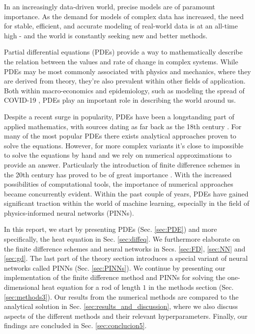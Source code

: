 In an increasingly data-driven world, precise models are of paramount importance.
As the demand for models of complex data has increased, the need for stable, efficient, and accurate modeling of real-world data is at an all-time high - and the world is constantly seeking new and better methods.

Partial differential equations (PDEs) provide a way to mathematically describe the relation between the values and rate of change in complex systems.
While PDEs may be most commonly associated with physics and mechanics, where they are derived from theory, they're also prevalent within other fields of application.
Both within macro-economics \cite{ecoPDE} and epidemiology, such as modeling the spread of COVID-19 \cite{covidus}, PDEs play an important role in describing the world around us. 

Despite a recent surge in popularity, PDEs have been a longstanding part of applied mathematics, with sources dating as far back as the 18th century \cite{Cajori}. For many of the most popular PDEs there exists analytical approaches proven to solve the equations. However, for more complex variants it's close to impossible to solve the equations by hand and we rely on numerical approximations to provide an answer. Particularly the introduction of finite difference schemes in the 20th century has proved to be of great importance \cite{sloan2012}. With the increased possibilities of computational tools, the importance of numerical approaches became concurrently evident. Within the past couple of years, PDEs have gained significant traction within the world of machine learning, especially in the field of physics-informed neural networks (PINNs).  

In this report, we start by presenting PDEs (Sec. \ref{sec:PDE}) and more specifically, the heat equation in Sec. \ref{sec:diffeq}.
We furthermore elaborate on the finite difference schemes and neural networks in Secs. \ref{sec:FD}, \ref{sec:NN} and \ref{sec:gd}. 
The last part of the theory section introduces a special variant of neural networks called PINNs (Sec. \ref{sec:PINNs}).
We continue by presenting our implementation of the finite difference method and PINNs for solving the one-dimensional heat equation for a rod of length $1$ in the methods section (Sec. \ref{sec:methods3}).
Our results from the numerical methods are compared to the analytical solution in Sec. \ref{sec:results_and_discussion}, where we also discuss aspects of the different methods and their relevant hyperparameters. 
Finally, our findings are concluded in Sec. \ref{sec:conclucion5}.

